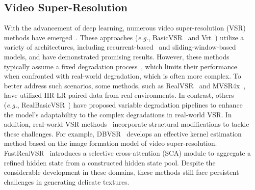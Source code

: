 \documentclass{article}
\newcommand\eg{\textit{e.g.}}
\begin{document}
\subsection{Video Super-Resolution}
\vspace{-1.mm}
With the advancement of deep learning, numerous video super-resolution (VSR) methods have emerged~\cite{jo2018deep,nah2019ntire,chan2022basicvsr++,liang2024vrt,chan2021basicvsr}. These approaches (\eg, BasicVSR~\cite{chan2021basicvsr} and Vrt~\cite{liang2024vrt}) utilize a variety of architectures, including recurrent-based~\cite{liang2022recurrent,shi2022rethinking} and sliding-window-based~\cite{li2020mucan,yi2019progressive} models, and have demonstrated promising results. However, these methods typically assume a fixed degradation process~\cite{xue2019video,yi2019progressive}, which limits their performance when confronted with real-world degradation, which is often more complex. To better address such scenarios, some methods, such as RealVSR~\cite{yang2021real} and MVSR4x~\cite{wang2023benchmark}, have utilized HR-LR paired data from real environments. In contrast, others (\eg, RealBasicVSR~\cite{chan2022investigating}) have proposed variable degradation pipelines to enhance the model's adaptability to the complex degradations in real-world VSR. In addition, real-world VSR methods~\cite{zhang2024realviformer,pan2021deep,xie2023mitigating} incorporate structural modifications to tackle these challenges. For example, DBVSR~\cite{pan2021deep} develops an effective kernel estimation method based on the image formation model of video super-resolution. FastRealVSR~\cite{xie2023mitigating} introduces a selective cross-attention (SCA) module to aggregate a refined hidden state from a constructed hidden state pool. Despite the considerable development in these domains, these methods still face persistent challenges in generating delicate textures.
\end{document}
